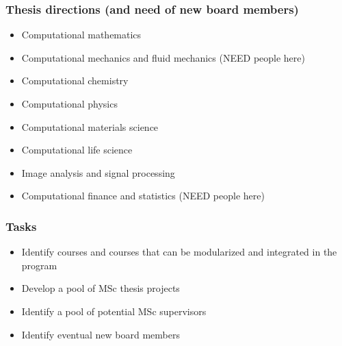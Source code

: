 \documentclass{beamer}
\begin{document}
\begin{frame}
\frametitle{Thesis directions (and need of new board members)}

\begin{block}{}
\begin{itemize}
\item Computational mathematics

\item Computational mechanics and fluid mechanics  (NEED people here)

\item Computational chemistry

\item Computational physics

\item Computational materials science

\item Computational life science

\item Image analysis and signal processing

\item Computational finance and statistics   (NEED people here)
\end{itemize}

\noindent
\end{block}
\end{frame}

\begin{frame}
\frametitle{Tasks}

\begin{block}{}
\begin{itemize}
\item Identify courses and courses that can be modularized and integrated in the program

\item Develop a pool of MSc thesis projects  

\item Identify a pool of potential MSc supervisors

\item Identify eventual new board members
\end{itemize}

\noindent
\end{block}
\end{frame}
\end{document}
